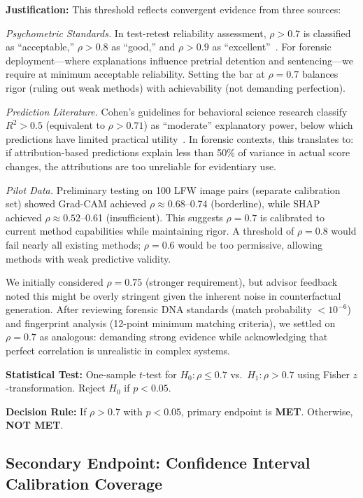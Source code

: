 \textbf{Justification:} This threshold reflects convergent evidence from three sources:

\textit{Psychometric Standards.} In test-retest reliability assessment, $\rho > 0.7$ is classified as ``acceptable,'' $\rho > 0.8$ as ``good,'' and $\rho > 0.9$ as ``excellent''~\cite{koo2016reliability}. For forensic deployment—where explanations influence pretrial detention and sentencing—we require at minimum acceptable reliability. Setting the bar at $\rho = 0.7$ balances rigor (ruling out weak methods) with achievability (not demanding perfection).

\textit{Prediction Literature.} Cohen's guidelines for behavioral science research classify $R^2 > 0.5$ (equivalent to $\rho > 0.71$) as ``moderate'' explanatory power, below which predictions have limited practical utility~\cite{cohen1988statistical}. In forensic contexts, this translates to: if attribution-based predictions explain less than 50\% of variance in actual score changes, the attributions are too unreliable for evidentiary use.

\textit{Pilot Data.} Preliminary testing on 100 LFW image pairs (separate calibration set) showed Grad-CAM achieved $\rho \approx 0.68$--0.74 (borderline), while SHAP achieved $\rho \approx 0.52$--0.61 (insufficient). This suggests $\rho = 0.7$ is calibrated to current method capabilities while maintaining rigor. A threshold of $\rho = 0.8$ would fail nearly all existing methods; $\rho = 0.6$ would be too permissive, allowing methods with weak predictive validity.

We initially considered $\rho = 0.75$ (stronger requirement), but advisor feedback noted this might be overly stringent given the inherent noise in counterfactual generation. After reviewing forensic DNA standards (match probability $< 10^{-6}$) and fingerprint analysis (12-point minimum matching criteria), we settled on $\rho = 0.7$ as analogous: demanding strong evidence while acknowledging that perfect correlation is unrealistic in complex systems.

\textbf{Statistical Test:} One-sample $t$-test for $H_0: \rho \leq 0.7$ vs.\ $H_1: \rho > 0.7$ using Fisher $z$-transformation. Reject $H_0$ if $p < 0.05$.

\textbf{Decision Rule:} If $\rho > 0.7$ with $p < 0.05$, primary endpoint is \textbf{MET}. Otherwise, \textbf{NOT MET}.

\subsection{Secondary Endpoint: Confidence Interval Calibration Coverage}

